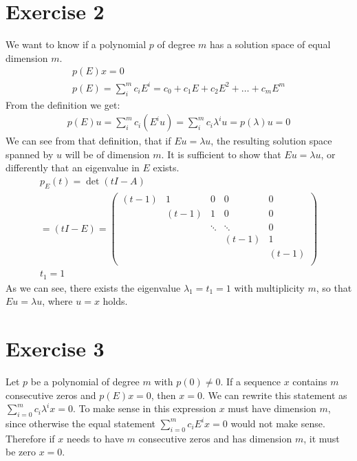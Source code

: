 \section{Exercise 2}
We want to know if a polynomial $p$ of degree $m$ has a solution space of equal dimension $m$.
\begin{gather*}
p(E)x = 0 \\
p(E) = \sum\limits_i^m c_i E^i = c_0 + c_1 E + c_2 E^2 + \ldots +c_m E^m
\end{gather*} 
From the definition we get:
\begin{gather*}
p(E)u = \sum\limits_i^m c_i (E^i u) = \sum\limits_i^m c_i \lambda^i u = p(\lambda)u = 0
\end{gather*}
We can see from that definition, that if $Eu = \lambda u$, the resulting solution space spanned by $u$ will be of dimension $m$.
It is sufficient to show that $Eu = \lambda u$, or differently that an eigenvalue in $E$ exists.
\begin{gather*}
p_E(t) = \det(tI -A) \\
= (tI - E) =  \left( \begin{array}{ccccc}
(t-1)&1 & 0 &0 &0 \\
& (t-1) &1 &0 &0 \\
& & \ddots & \ddots &0 \\
& & & (t-1) & 1 \\
& & & & (t-1) \\
\end{array} \right) \\
t_1 = 1
\end{gather*}
As we can see, there exists the eigenvalue $\lambda_1 = t_1 = 1$ with multiplicity $m$, so that $Eu = \lambda u$, where $u = x$ holds.
\section{Exercise 3}
Let $p$ be a polynomial of degree $m$ with $p(0) \neq 0$. If a sequence $x$ contains $m$ consecutive zeros and $p(E)x = 0$, then $x = 0$.
We can rewrite this statement as $\sum\limits_{i = 0} ^m  c_i \lambda^i x = 0$. To make sense in this expression $x$ must have dimension $m$, since otherwise the equal statement $\sum\limits_{i = 0} ^m  c_i E^i x = 0$ would not make sense. Therefore if $x$ needs to have $m$ consecutive zeros and has dimension $m$, it must be zero $x = 0$.
